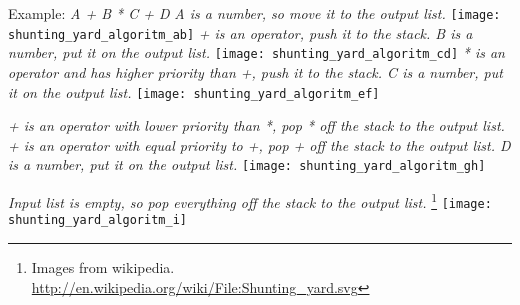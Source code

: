 \documentclass[12pt,a4paper]{article}
\begin{document}
\begin{itemize}
\textnormal{Example: \newline
\textit{ A + B * C + D}
\newline
\textit{A is a number, so move it to the output list. }
\newline
}
\texttt{[image: shunting\_yard\_algoritm\_ab]}
\textnormal{
\newline
\textit{+ is an operator, push it to the stack. \newline
B is a number, put it on the output list.}
\newline
}
\texttt{[image: shunting\_yard\_algoritm\_cd]}
\textnormal{
\newline
\textit{* is an operator and has higher priority than +, push it to the stack. \newline
C is a number, put it on the output list.}
\newline
}
\texttt{[image: shunting\_yard\_algoritm\_ef]}

\textnormal{
\newline
\textit{+ is an operator with lower priority than *, pop * off the stack to the output list. \newline
+ is an operator with equal priority to +, pop + off the stack to the output list. \newline
D is a number, put it on the output list.}
\newline
}
\texttt{[image: shunting\_yard\_algoritm\_gh]}

\textnormal{
\newline
\textit{Input list is empty, so pop everything off the stack to the output list.} \newline
\footnote{Images from wikipedia. \url{http://en.wikipedia.org/wiki/File:Shunting_yard.svg}}
}
\texttt{[image: shunting\_yard\_algoritm\_i]}







\end{itemize}
\end{document}

